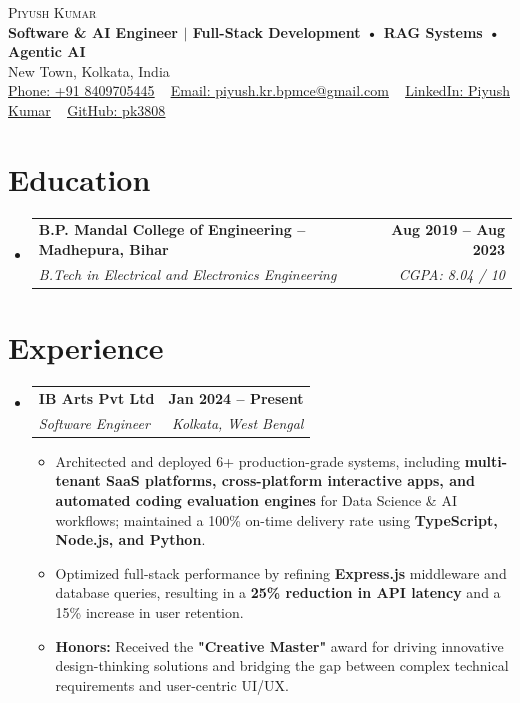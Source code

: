 \documentclass[letterpaper,11pt]{article}
\makeatletter
\newcommand{\resumeItem}[1]{
  \item\small{
    {#1 \vspace{-2pt}}
  }
}
\newcommand{\resumeSubheading}[4]{
  \vspace{-2pt}\item
    \begin{tabular*}{1.0\textwidth}[t]{l@{\extracolsep{\fill}}r}
      \textbf{#1} & \textbf{\small #2} \\
      \textit{\small#3} & \textit{\small #4} \\
    \end{tabular*}\vspace{-7pt}
}
\newcommand{\resumeItemListStart}{\begin{itemize}[label=\textbullet, leftmargin=1.2em]}
\newcommand{\resumeItemListEnd}{\end{itemize}\vspace{-5pt}}
\newcommand{\resumeSubHeadingListStart}{\begin{itemize}[leftmargin=0in, label={}]}
\newcommand{\resumeSubHeadingListEnd}{\end{itemize}}
\makeatother
\begin{document}
\begin{center}
    {\Huge \scshape Piyush Kumar} \\ \vspace{2pt}
    \small \textbf{Software \& AI Engineer $|$ Full-Stack Development • RAG Systems • Agentic AI} \\ \vspace{2pt}
    New Town, Kolkata, India \\ \vspace{4pt}
    \href{tel:+918409705445}{\underline{Phone: +91 8409705445}} ~
    \href{mailto:piyush.kr.bpmce@gmail.com}{\underline{Email: piyush.kr.bpmce@gmail.com}} ~
    \href{https://www.linkedin.com/in/piyush-kumar-724877217/}{\underline{LinkedIn: Piyush Kumar}} ~
    \href{https://github.com/pk3808}{\underline{GitHub: pk3808}}
\end{center}

\section{Education}
\resumeSubHeadingListStart
  \resumeSubheading
    {B.P. Mandal College of Engineering -- Madhepura, Bihar}{Aug 2019 -- Aug 2023}
    {B.Tech in Electrical and Electronics Engineering}{CGPA: 8.04 / 10}
\resumeSubHeadingListEnd

\section{Experience}
\resumeSubHeadingListStart
  \resumeSubheading
    {IB Arts Pvt Ltd}{Jan 2024 -- Present}
    {Software Engineer}{Kolkata, West Bengal}
    {}
    \resumeItemListStart
     \resumeItem{Architected and deployed 6+ production-grade systems, including \textbf{multi-tenant SaaS platforms, cross-platform interactive apps, and automated coding evaluation engines} for Data Science \& AI workflows; maintained a 100\% on-time delivery rate using \textbf{TypeScript, Node.js, and Python}.}
      \resumeItem{Optimized full-stack performance by refining \textbf{Express.js} middleware and database queries, resulting in a \textbf{25\% reduction in API latency} and a 15\% increase in user retention.}
      \resumeItem{\textbf{Honors:} Received the \textbf{"Creative Master"} award for driving innovative design-thinking solutions and bridging the gap between complex technical requirements and user-centric UI/UX.}
    \resumeItemListEnd
\resumeSubHeadingListEnd
\end{document}

